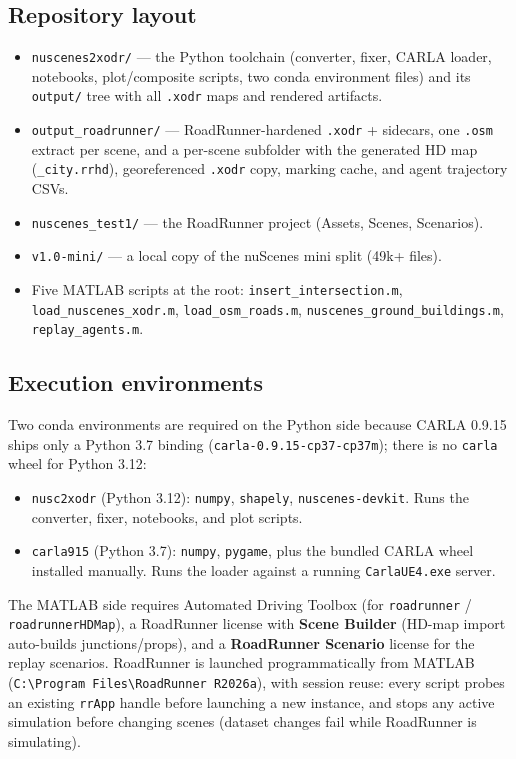 \documentclass[11pt]{article}
\newcommand{\code}[1]{{\setlength{\fboxsep}{1.5pt}\colorbox{codegray}{\small\texttt{#1}}}}
\newcommand{\file}[1]{\texttt{#1}}
\begin{document}
\subsection{Repository layout}
\begin{itemize}
\item \file{nuscenes2xodr/} --- the Python toolchain (converter, fixer, CARLA loader,
      notebooks, plot/composite scripts, two conda environment files) and its
      \file{output/} tree with all \file{.xodr} maps and rendered artifacts.
\item \file{output\_roadrunner/} --- RoadRunner-hardened \file{.xodr} + sidecars, one
      \file{.osm} extract per scene, and a per-scene subfolder with the generated HD map
      (\file{\_city.rrhd}), georeferenced \file{.xodr} copy, marking cache, and agent
      trajectory CSVs.
\item \file{nuscenes\_test1/} --- the RoadRunner project (Assets, Scenes, Scenarios).
\item \file{v1.0-mini/} --- a local copy of the nuScenes mini split (49k+ files).
\item Five MATLAB scripts at the root: \file{insert\_intersection.m},
      \file{load\_nuscenes\_xodr.m}, \file{load\_osm\_roads.m},
      \file{nuscenes\_ground\_buildings.m}, \file{replay\_agents.m}.
\end{itemize}

\subsection{Execution environments}
Two conda environments are required on the Python side because CARLA 0.9.15 ships only a
Python 3.7 binding (\file{carla-0.9.15-cp37-cp37m}); there is no \file{carla} wheel for
Python 3.12:
\begin{itemize}
\item \file{nusc2xodr} (Python 3.12): \file{numpy}, \file{shapely},
      \file{nuscenes-devkit}. Runs the converter, fixer, notebooks, and plot scripts.
\item \file{carla915} (Python 3.7): \file{numpy}, \file{pygame}, plus the bundled CARLA
      wheel installed manually. Runs the loader against a running
      \file{CarlaUE4.exe} server.
\end{itemize}
The MATLAB side requires Automated Driving Toolbox (for \code{roadrunner} /
\code{roadrunnerHDMap}), a RoadRunner license with \textbf{Scene Builder} (HD-map
import auto-builds junctions/props), and a \textbf{RoadRunner Scenario} license for the
replay scenarios. RoadRunner is launched programmatically from MATLAB
(\file{C:\textbackslash Program Files\textbackslash RoadRunner R2026a}), with session
reuse: every script probes an existing \code{rrApp} handle before launching a new
instance, and stops any active simulation before changing scenes (dataset changes fail
while RoadRunner is simulating).
\end{document}
